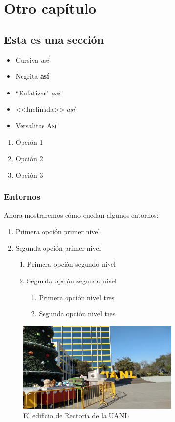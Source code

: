\chapter{Otro capítulo}

\section{Esta es una sección}

\begin{itemize}
    \item Cursiva \textit{así}
    \item Negrita \textbf{así}
    \item ``Enfatizar" \emph{así}
    \item <<Inclinada>> \textsl{así}
    \item Versalitas \textsc{Así}
\end{itemize}

\begin{enumerate}
    \item Opción 1
    \item Opción 2
    \item Opción 3
\end{enumerate}

\subsection{Entornos}

Ahora mostraremos cómo quedan algunos entornos:

\begin{enumerate}
   \item Primera opción primer nivel
   \item Segunda opción primer nivel
   \begin{enumerate}
     \item Primera opción segundo nivel
     \item Segunda opción segundo nivel
     \begin{enumerate}
       \item Primera opción nivel tres
       \item Segunda opción nivel tres
     \end{enumerate}
   \end{enumerate}
 \end{enumerate}
 
\begin{figure}[htp]
	\centering
\includegraphics[width=8cm]{Figuras/Invierno UANL.jpg}
	\caption[Edificio de Rectoría]{El edificio de Rectoría de la UANL}
	\label{fig:uanl}
\end{figure}